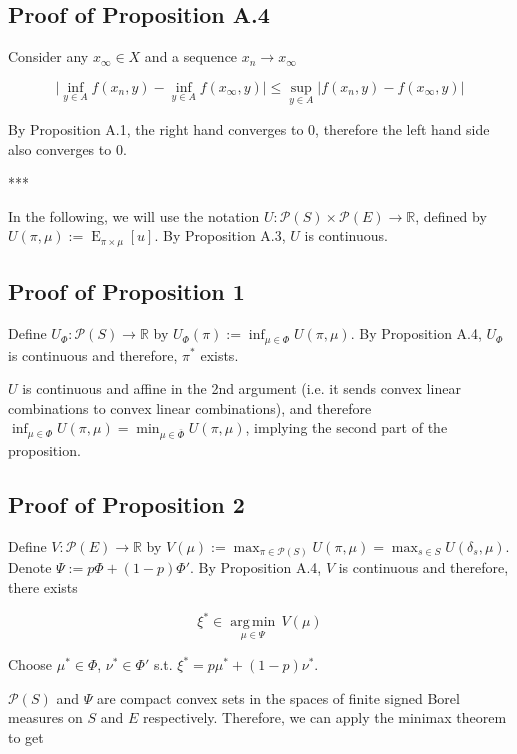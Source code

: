 \documentclass[a4paper]{article}
\DeclareMathOperator{\E}{E}
\newcommand{\Argmin}[1]{\underset{#1}{\operatorname{arg\,min}}\,}
\newcommand{\Reals}{\mathbb{R}}
\newcommand{\Abs}[1]{\lvert #1 \rvert}
\newcommand{\Prob}{\mathcal{P}}
\begin{document}
\subsection{Proof of Proposition A.4}

Consider any ${x_\infty \in X}$ and a sequence ${x_n \rightarrow x_\infty}$

$$\Abs{\inf_{y \in A} f(x_n,y) - \inf_{y \in A} f(x_\infty,y)} \leq \sup_{y \in A} \Abs{f(x_n,y) - f(x_\infty,y)}$$

By Proposition A.1, the right hand converges to 0, therefore the left hand side also converges to 0.

***

In the following, we will use the notation ${U: \Prob(S) \times \Prob(E) \rightarrow \Reals}$, defined by ${U(\pi,\mu):=\E_{\pi \times \mu}[u]}$. By Proposition A.3, ${U}$ is continuous. 

\subsection{Proof of Proposition 1}

Define ${U_\Phi: \Prob(S) \rightarrow \Reals}$ by ${U_\Phi(\pi):= \inf_{\mu \in \Phi} U(\pi,\mu)}$. By Proposition A.4, ${U_{\Phi}}$ is continuous and therefore, ${\pi^*}$ exists.

${U}$ is continuous and affine in the 2nd argument (i.e. it sends convex linear combinations to convex linear combinations), and therefore ${\inf_{\mu \in \Phi} U(\pi,\mu)=\min_{\mu \in \bar{\Phi}} U(\pi,\mu)}$, implying the second part of the proposition.

\subsection{Proof of Proposition 2}

Define ${V: \Prob(E) \rightarrow \Reals}$ by ${V(\mu):=\max_{\pi \in \Prob(S)} U(\pi,\mu)=\max_{s \in S} U(\delta_s,\mu)}$. Denote ${\Psi:=p\Phi + (1-p)\Phi'}$. By Proposition A.4, ${V}$ is continuous and therefore, there exists

$$\xi^* \in \Argmin{\mu \in \Psi} V(\mu)$$

Choose ${\mu^* \in \Phi}$, ${\nu^* \in \Phi'}$ s.t. ${\xi^* = p \mu^* + (1-p) \nu^*}$.

${\Prob(S)}$ and ${\Psi}$ are compact convex sets in the spaces of finite signed Borel measures on ${S}$ and ${E}$ respectively. Therefore, we can apply the minimax theorem to get
\end{document}
